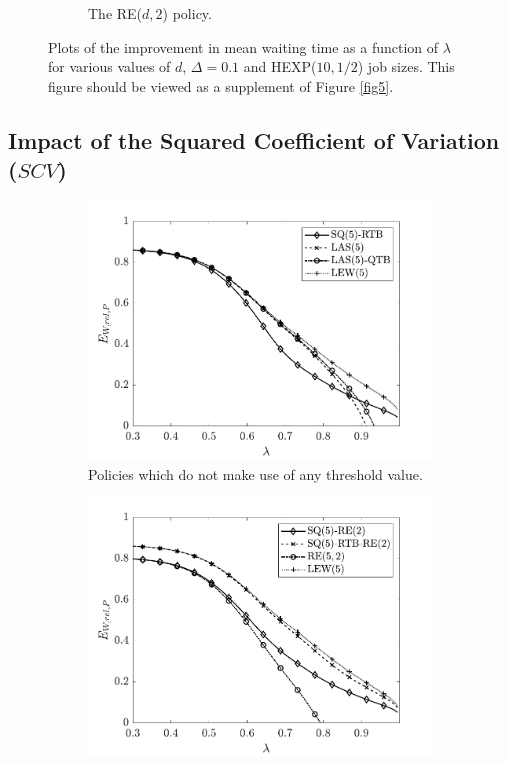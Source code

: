 \documentclass[12pt]{report}
\begin{document}
\begin{figure}[t]
\begin{center}
\begin{subfigure}{.43\textwidth}
\caption{The RE($d, 2$) policy.}
\label{fig7b}
\end{subfigure}
\caption{Plots of the improvement in mean waiting time as a function of $\lambda$ for various values of $d$, $\Delta=0.1$ and HEXP($10, 1/2$) job sizes. This figure should be viewed as a supplement of Figure \ref{fig5}.}
\label{fig7}
\end{center}
\end{figure}

\subsection{Impact of the Squared Coefficient of Variation ($SCV$)}
\begin{figure}[t]
\begin{center}
\begin{subfigure}{0.43\textwidth}
\centering
\captionsetup{width=.8\linewidth}
\includegraphics[width=1\linewidth]{figures/Chapter7/fig6a.pdf}
\caption{Policies which do not make use of any threshold value.}
\label{fig3a}
\end{subfigure}
\begin{subfigure}{.43\textwidth}
\centering
\captionsetup{width=.8\linewidth}
\includegraphics[width=1\linewidth]{figures/Chapter7/fig6b.pdf}

\end{subfigure}
\end{center}
\end{figure}
\end{document}
